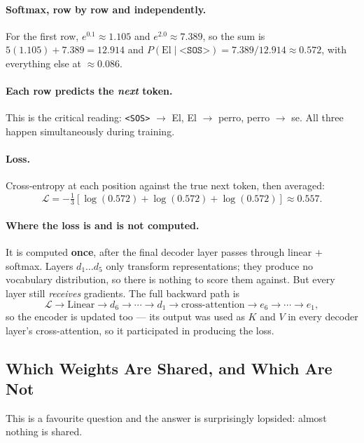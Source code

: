 \documentclass[11pt,a4paper]{article}
\begin{document}
\paragraph{Softmax, row by row and independently.} For the first row,
$e^{0.1} \approx 1.105$ and $e^{2.0} \approx 7.389$, so the sum is
$5(1.105) + 7.389 = 12.914$ and $P(\text{El} \mid \texttt{<SOS>}) = 7.389/12.914 \approx
0.572$, with everything else at $\approx 0.086$.

\paragraph{Each row predicts the \emph{next} token.} This is the critical reading:
\texttt{<SOS>} $\rightarrow$ El, El $\rightarrow$ perro, perro $\rightarrow$ se. All three
happen simultaneously during training.

\paragraph{Loss.} Cross-entropy at each position against the true next token, then averaged:
\[
\mathcal{L} = -\tfrac{1}{3}\left[\log(0.572) + \log(0.572) + \log(0.572)\right] \approx 0.557 .
\]

\paragraph{Where the loss is and is not computed.} It is computed \textbf{once}, after the
final decoder layer passes through linear $+$ softmax. Layers $d_1 \ldots d_5$ only transform
representations; they produce no vocabulary distribution, so there is nothing to score them
against. But every layer still \emph{receives} gradients. The full backward path is
\[
\mathcal{L} \rightarrow \text{Linear} \rightarrow d_6 \rightarrow \cdots \rightarrow d_1
\rightarrow \text{cross-attention} \rightarrow e_6 \rightarrow \cdots \rightarrow e_1 ,
\]
so the encoder is updated too --- its output was used as $K$ and $V$ in every decoder layer's
cross-attention, so it participated in producing the loss.

\subsection{Which Weights Are Shared, and Which Are Not}

This is a favourite question and the answer is surprisingly lopsided: almost nothing is
shared.
\end{document}
